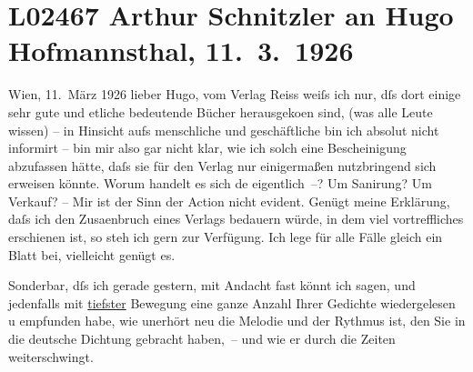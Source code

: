 

\section[Arthur Schnitzler an Hugo Hofmannsthal, 11. 3. 1926]{L02467 Arthur Schnitzler an Hugo Hofmannsthal, 11. 3. 1926}
\nopagebreak{}
\rehead{ }\normalsize\beginnumbering{}
\toendnotes[C]{\smallbreak\pagebreak[2]}
\toendnotes[C]{\smallbreak}
\pstart
           \raggedleft{}{\pb}Wien, 11. März 1926\pend
           \vspace{0.5em}
\pstart
           lieber Hugo, vom Verlag Reiss
               weiſs ich nur, dſs dort einige sehr gute und etliche bedeutende Bücher herausgeko{\geminationm}en sind, (was alle Leute wissen) – \introOben{}in Hinsicht aufs\introOben{} menschliche und geschäftliche bin ich absolut nicht
               informirt – bin mir also gar nicht klar, wie ich solch eine Bescheinigung abzufassen
               hätte, daſs sie für den Verlag nur einigermaßen nutzbringend sich erweisen könnte.
               Worum handelt es sich de{\geminationn} eigentlich –? Um Sanirung? Um
               Verkauf? – Mir ist der Sinn der Action nicht evident. Genügt meine Erklärung, daſs
               ich den Zusa{\geminationm}enbruch eines Verlags bedauern würde, in
               dem viel vortreffliches erschienen ist, so steh ich gern zur Verfügung. Ich lege für
               alle Fälle gleich ein Blatt bei, vielleicht genügt es.\pend
           
\pstart
           {\pb}Sonderbar, dſs ich gerade gestern, mit Andacht fast
               könnt ich sagen, und jedenfalls mit \uline{tiefster} Bewegung
               eine ganze Anzahl Ihrer Gedichte \introOben{}wieder\introOben{}gelesen u empfunden
               habe, wie unerhört neu die Melodie und der Rythmus ist, den Sie in die deutsche
               Dichtung gebracht haben, – und wie er durch die Zeiten weiterschwingt.\pend
           
